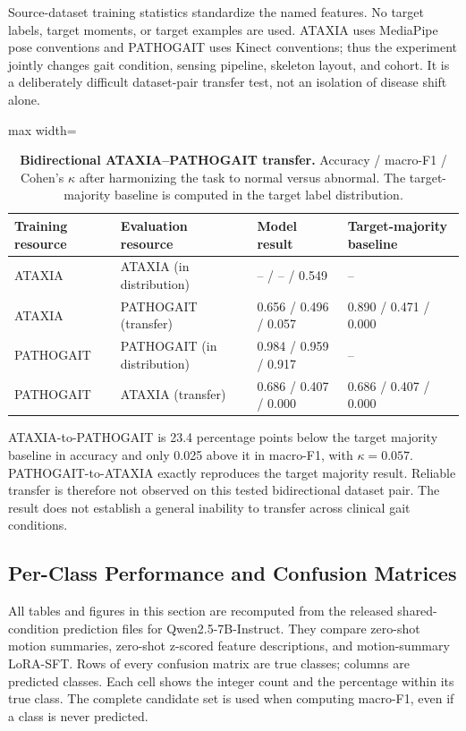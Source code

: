 Source-dataset training statistics standardize the named features. No target labels, target moments, or target examples are used. ATAXIA uses MediaPipe pose conventions and PATHOGAIT uses Kinect conventions; thus the experiment jointly changes gait condition, sensing pipeline, skeleton layout, and cohort. It is a deliberately difficult dataset-pair transfer test, not an isolation of disease shift alone.

\begin{table}[H]
\centering
\caption{\textbf{Bidirectional ATAXIA--PATHOGAIT transfer.} Accuracy / macro-F1 / Cohen's $\kappa$ after harmonizing the task to normal versus abnormal. The target-majority baseline is computed in the target label distribution.}
\label{tab:transfer}
\small
\begin{adjustbox}{max width=\textwidth}
\begin{tabular}{llll}
\toprule
Training resource & Evaluation resource & Model result & Target-majority baseline \\
\midrule
ATAXIA & ATAXIA (in distribution) & -- / -- / 0.549 & -- \\
ATAXIA & PATHOGAIT (transfer) & 0.656 / 0.496 / 0.057 & 0.890 / 0.471 / 0.000 \\
PATHOGAIT & PATHOGAIT (in distribution) & 0.984 / 0.959 / 0.917 & -- \\
PATHOGAIT & ATAXIA (transfer) & 0.686 / 0.407 / 0.000 & 0.686 / 0.407 / 0.000 \\
\bottomrule
\end{tabular}
\end{adjustbox}
\end{table}

ATAXIA-to-PATHOGAIT is 23.4 percentage points below the target majority baseline in accuracy and only 0.025 above it in macro-F1, with $\kappa=0.057$. PATHOGAIT-to-ATAXIA exactly reproduces the target majority result. Reliable transfer is therefore not observed on this tested bidirectional dataset pair. The result does not establish a general inability to transfer across clinical gait conditions.

\subsection{Per-Class Performance and Confusion Matrices}
\label{sec:supp_perclass}

All tables and figures in this section are recomputed from the released shared-condition prediction files for Qwen2.5-7B-Instruct. They compare zero-shot motion summaries, zero-shot z-scored feature descriptions, and motion-summary LoRA-SFT. Rows of every confusion matrix are true classes; columns are predicted classes. Each cell shows the integer count and the percentage within its true class. The complete candidate set is used when computing macro-F1, even if a class is never predicted.

